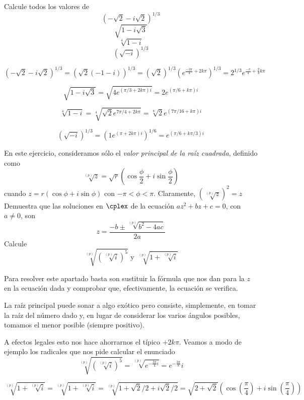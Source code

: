 \begin{problem}[10]
Calcule todos los valores de
\ppart
\[\left(-\sqrt{2}-i\sqrt{2}\right)^{1/3}\]
\ppart
\[\sqrt{1-i\sqrt{3}}\]
\ppart
\[\sqrt[4]{1-i}\]
\ppart
\[\left(\sqrt{-i}\right)^{1/3}\]

\solution

\spart
\[\left(-\sqrt{2}-i\sqrt{2}\right)^{1/3}=\left(\sqrt{2}(-1-i)\right)^{1/3}=(\sqrt{2})^{1/3}\left(e^{\frac{-3\pi}{4}+2k\pi}\right)^{1/3}=2^{1/3}e^{\frac{-\pi}{4}+\frac{2}{3}k\pi}\]

\spart
\[\sqrt{1-i\sqrt{3}} = \sqrt{4e^{(\pi/3+2k\pi)i}}=2e^{(\pi/6+k\pi)i}\]

\spart
\[\sqrt[4]{1-i} = \sqrt[4]{\sqrt{2}e^{7\pi/4+2k\pi}} = \sqrt[8]{2}e^{(7\pi/16 + k\pi )i}\]

\spart

\[\left(\sqrt{-i}\right)^{1/3} = \left(1e^{(\pi+2k\pi)i}\right)^{1/6} = e^{(\pi/6+k\pi/3)i}\]
\end{problem}

\begin{problem}[11]
En este ejercicio, consideramos sólo el \textit{valor principal de la raíz cuadrada}, definido como
\[\sqrt[(p)]{z}=\sqrt{r}\left(\cos\frac{\phi}{2}+i\sin\frac{\phi}{2}\right)\]
cuando $z=r(\cos\phi+i\sin\phi)$ con $-\pi < \phi < \pi$. Claramente, $\left( \sqrt[(p)]{z} \right)^2=z$
\ppart Demuestra que las soluciones en $\cplex$ de la ecuación $az^2+bz+c=0$, con $a\neq 0$, son
\[z=\frac{-b\pm \sqrt[(p)]{b^2-4ac}}{2a}\]
\ppart
Calcule
\[\sqrt[(p)]{\left(\sqrt[(p)]{i}\right)^5} \text { y } \sqrt[(p)]{1+\sqrt[(p)]{i}}\]
\solution

\spart
Para resolver este apartado basta son sustituir la fórmula que nos dan para la $z$ en la ecuación dada y comprobar que, efectivamente, la ecuación se verifica.

\spart
La raíz principal puede sonar a algo exótico pero consiste, simplemente, en tomar la raíz del número dado y, en lugar de considerar los varios ángulos posibles, tomamos el menor posible (siempre positivo).

A efectos legales esto nos hace ahorrarnos el típico $+2k\pi$. Veamos a modo de ejemplo los radicales que nos pide calcular el enunciado
\[\sqrt[(p)]{\left( \sqrt[(p)]{i}\right)^5} = \sqrt[(p)]{e^{-\frac{3\pi}{4}i}} = e^{-\frac{3\pi}{8}}i\]

\[\sqrt[(p)]{1+\sqrt[(p)]{i}} = \sqrt[(p)]{1+\sqrt[(p)]{i}} = \sqrt[(p)]{1+\sqrt{2}/2+i\sqrt{2}/2} = \sqrt{2+\sqrt{2}}\left( \cos\left(\frac{π}{4}\right)+i\sin\left(\frac{π}{4}\right)\right)\]
\end{problem}

